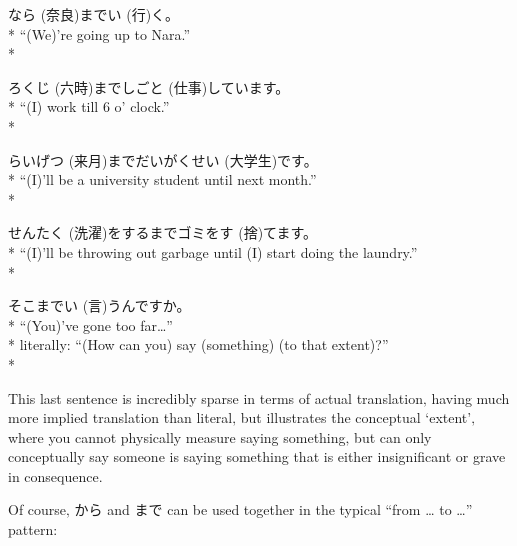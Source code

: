 \documentclass[11pt, b5paper, twoside, openright, onecolumn]{book}
\makeatletter
\newcommand*{\rubystack}[2]{{\relscale{0.5}%
  \begin{tabular}[b]{@{}c@{}}%
    {#1}\\%
   {\textscale{2}{#2}}%
  \end{tabular}}%
}
\DeclareRobustCommand*{\ruby}[2]{%
  \mbox{%
    \setlength{\parskip}{0ex}%
    \BeginAccSupp{method=pdfstringdef,ActualText={#1}}%
      \rubystack{\phantom{#2}}{#1}%
      \llap{%
        \rubystack{#2}{\phantom{#1}}%
      }%
    \EndAccSupp{}%
  }%
}
\renewcommand*{\ruby}[2]{#2 (#1)}%
\newenvironment{exampleblock}{
\setlength{\parindent}{0.6in}
\begin{minipage}[t]{\dimexpr\textwidth-\parindent}}
{\end{minipage}}
\makeatother
\begin{document}
\vspace{0.4cm}
\begin{exampleblock}
\ruby{奈良}{なら}まで\ruby{行}{い}く。 \\* 
“(We)’re going up to Nara.” \\* 
\end{exampleblock}
\vspace{0.2cm}

\begin{exampleblock}
\ruby{六時}{ろくじ}まで\ruby{仕事}{しごと}しています。 \\* 
“(I) work till 6 o’ clock.” \\* 
\end{exampleblock}
\vspace{0.2cm}

\begin{exampleblock}
\ruby{来月}{らいげつ}まで\ruby{大学生}{だいがくせい}です。 \\* 
“(I)’ll be a university student until next month.” \\* 
\end{exampleblock}
\vspace{0.2cm}

\begin{exampleblock}
\ruby{洗濯}{せんたく}をするまでゴミを\ruby{捨}{す}てます。 \\* 
“(I)’ll be throwing out garbage until (I) start doing the laundry.” \\* 
\end{exampleblock}
\vspace{0.2cm}

\begin{exampleblock}
そこまで\ruby{言}{い}うんですか。 \\* 
“(You)’ve gone too far…” \\* 
literally: “(How can you) say (something) (to that extent)?” \\* 
\end{exampleblock}
\vspace{0.2cm}

This last sentence is incredibly sparse in terms of actual translation‚ having much more implied translation than literal‚ but illustrates the conceptual ‘extent’‚ where you cannot physically measure saying something‚ but can only conceptually say someone is saying something that is either insignificant or grave in consequence.

Of course‚ から and まで can be used together in the typical “from … to …” pattern:
\end{document}
